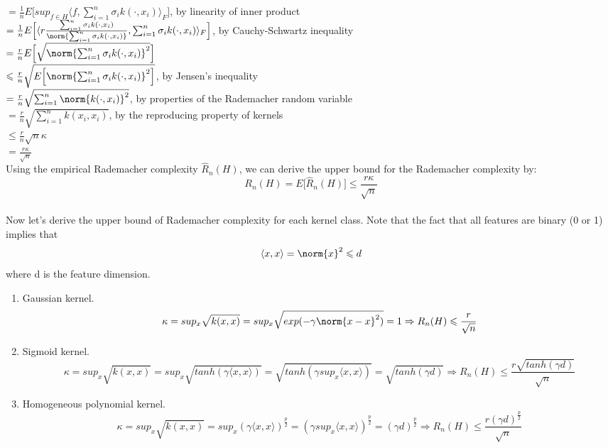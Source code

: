 \documentclass{article}
\begin{document}
$= \frac{1}{n}E\Big[sup_{f\in H} \langle f,\sum_{i=1}^{n} \sigma_{i}k(\cdot,x_i) \rangle_{F} \Big]$, by linearity of inner product\\

$= \frac{1}{n}E\Big[\langle r\frac{\sum_{i=1}^{n} \sigma_{i}k(\cdot,x_i)}{\norm{\sum_{i=1}^{n} \sigma_{i}k(\cdot,x_i)}},\sum_{i=1}^{n} \sigma_{i}k(\cdot,x_i) \rangle_{F} \Big]$, by Cauchy-Schwartz inequality\\

$= \frac{r}{n}E\Big[ \sqrt{\norm{\sum_{i=1}^{n} \sigma_{i}k(\cdot,x_i)}^2} \Big]$\\

$\leqslant \frac{r}{n}\sqrt{E\Big[ \norm{\sum_{i=1}^{n} \sigma_{i}k(\cdot,x_i)}^2 \Big]}$, by Jensen's inequality\\

$= \frac{r}{n}\sqrt{\sum_{i=1}^{n} \norm{k(\cdot,x_i)}^2}$, by properties of the Rademacher random variable\\

$= \frac{r}{n}\sqrt{\sum_{i=1}^{n} k(x_i,x_i)}$, by the reproducing property of kernels\\

$\leqslant \frac{r}{n}\sqrt{n}\kappa$\\

$= \frac{r\kappa}{\sqrt{n}}$\\

Using the empirical Rademacher complexity $\hat{R}_n(H)$, we can derive the upper bound for the Rademacher complexity by: $$R_n(H) = E\Big[ \hat{R}_n(H) \Big] \leqslant \frac{r\kappa}{\sqrt{n}}$$ \\

Now let's derive the upper bound of Rademacher complexity for each kernel class. Note that the fact that all features are binary (0 or 1) implies that $$\langle x,x \rangle = \norm{x}^2 \leqslant d$$ where d is the feature dimension.\\

\begin{enumerate}
  \item Gaussian kernel. $$\kappa = sup_x\sqrt{k(x,x)} = sup_x\sqrt{exp(-\gamma \norm{x-x}^2)} = 1 \Rightarrow R_n(H) \leqslant \frac{r}{\sqrt{n}}$$
  
  \item Sigmoid kernel. $$\kappa = sup_x\sqrt{k(x,x)} = sup_x \sqrt{tanh(\gamma \langle x,x \rangle)} = \sqrt{tanh(\gamma  sup_x \langle x,x \rangle)} = \sqrt{tanh(\gamma  d)} \Rightarrow {R}_n(H)\leqslant\frac{r\sqrt{tanh(\gamma d)}}{\sqrt{n}}$$
  
  \item Homogeneous polynomial kernel. $$\kappa = sup_x\sqrt{k(x,x)} = sup_x (\gamma \langle x,x \rangle)^\frac{p}{2} =  (\gamma sup_x \langle x,x \rangle)^\frac{p}{2} =  (\gamma d)^\frac{p}{2} \Rightarrow {R}_n(H) \leqslant \frac{r(\gamma d)^\frac{p}{2}}{\sqrt{n}}$$
\end{enumerate}
\end{document}
